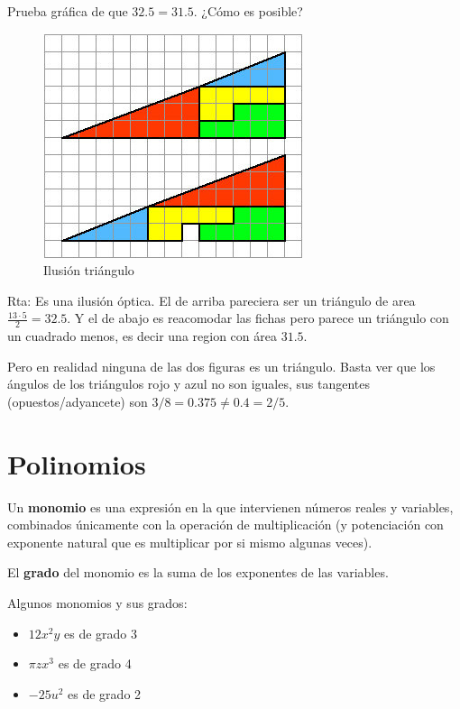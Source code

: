 \begin{example}
Prueba gráfica de que $32.5 = 31.5$.  ¿Cómo es posible?
\end{example}

\begin{figure}[h]
\centering\includegraphics[scale=0.6]{images/01_precalculo/ilusion_triangulo.jpg}
\caption{Ilusión triángulo}
\end{figure}

Rta: Es una ilusión óptica.  El de arriba pareciera ser un triángulo de area $ \frac{13 \cdot 5}{2} = 32.5$.  Y el de abajo es reacomodar las fichas pero parece un triángulo con un cuadrado menos, es decir una region con área $31.5$.  

Pero en realidad ninguna de las dos figuras es un triángulo.  Basta ver que los ángulos de los triángulos rojo y azul no son iguales, sus tangentes (opuestos/adyancete) son $3/8 = 0.375 \neq 0.4 = 2/5 $.



\chapter{Polinomios}

\begin{definition}[Monomio] 
Un \textbf{monomio} es una expresión en la que intervienen números reales y variables, combinados únicamente con la operación de multiplicación (y potenciación con exponente natural que es multiplicar por si mismo algunas veces).

El \textbf{grado} del monomio es la suma de los exponentes de las variables.
\end{definition}

\begin{example}
Algunos monomios y sus grados:

\begin{itemize}
\item $12x^2y$ es de grado 3
\item $\pi z x^3$ es de grado 4
\item $-25 u^2$ es de grado 2
\end{itemize}
\end{example}

